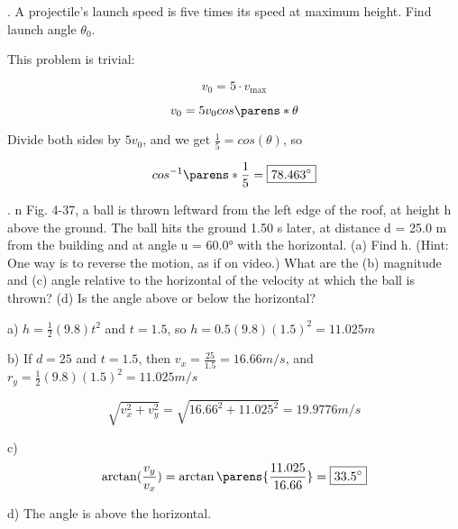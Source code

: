 \documentclass{scrreprt} %
\begin{document}
. A projectile's launch speed is five times its speed at maximum height.
Find launch angle $\theta_0$.

This problem is trivial:

$$v_0 = 5\cdot v_{\max}$$

$$v_0 = 5v_0cos\parens*{\theta}$$

Divide both sides by $5v_0$, and we get $\frac{1}{5}=cos(\theta)$, so

$$cos^{-1}\parens*{\frac{1}{5}} = \boxed{78.463^\circ}$$






. n Fig. 4-37, a ball is thrown leftward from the left edge of the
roof, at  height  h above  the  ground. The  ball  hits  the  ground  1.50 s
later, at distance d = 25.0 m from the building and at angle u = 60.0°
with  the  horizontal. (a)  Find  h.
(Hint: One way is to reverse the
motion, as  if  on  video.)  What
are  the  (b)  magnitude  and  (c)
angle  relative  to  the  horizontal
of the velocity at which the ball
is thrown? (d) Is the angle
above or below the horizontal? \newline


a) $h=\frac{1}{2}(9.8)t^2$ and $t = 1.5$, so $h = \boxed{0.5(9.8)(1.5)^2 = 11.025 m}$

b) If $d=25$ and $t=1.5$, then $v_x = \frac{25}{1.5} = 16.66 m/s$, and $r_y = \frac{1}{2}(9.8)(1.5)^2 = 11.025 m/s$

$$\sqrt{v_x^2 + v_y^2} = \sqrt{16.66^2 + 11.025^2} = \boxed{19.9776 m/s}$$

c) $$\arctan (\frac{v_y}{v_x}) = \arctan \parens{\frac{11.025}{16.66}} = \boxed{33.5^\circ}$$

d) The angle is above the horizontal.
\end{document}
